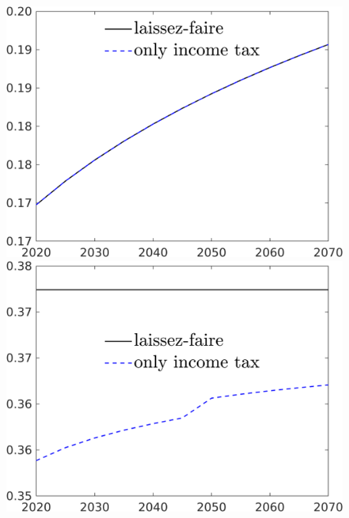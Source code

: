 \begin{figure}[h!!]
\begin{minipage}[]{0.32\textwidth}
	\end{minipage}
	\begin{minipage}[]{0.32\textwidth}
		\includegraphics[width=1\textwidth]{../../codding_model/own_basedOnFried/optimalPol_190722_tidiedUp/figures/all_10Aout22/CountTaul_modnsk_target_LgLf_spillover0_sep1_extern0_PV1_etaa0.79_lgd1.png}
	\end{minipage}
	\begin{minipage}[]{0.32\textwidth}
		\includegraphics[width=1\textwidth]{../../codding_model/own_basedOnFried/optimalPol_190722_tidiedUp/figures/all_10Aout22/CountTaul_modnsk_target_hl_spillover0_sep1_extern0_PV1_etaa0.79_lgd1.png}

\end{minipage}
\end{figure}
